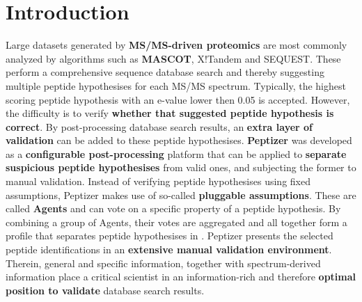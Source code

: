 \chapter{Introduction}
\npar Large datasets generated by \textbf{MS/MS-driven proteomics} are most commonly analyzed by algorithms such as \textbf{MASCOT}, X!Tandem and SEQUEST. These perform a comprehensive sequence database search and thereby suggesting multiple peptide hypothesises for each MS/MS spectrum. Typically, the highest scoring peptide hypothesis with an e-value lower then 0.05 is accepted. However, the difficulty is to verify \textbf{whether that suggested peptide hypothesis is correct}. By post-processing database search results, an \textbf{extra layer of validation} can be added to these peptide hypothesises. \textbf{Peptizer} was developed as a \textbf{configurable post-processing }platform that can be applied to \textbf{separate suspicious peptide hypothesises} from valid ones, and subjecting the former to manual validation.
\npar Instead of verifying peptide hypothesises using fixed assumptions, Peptizer makes use of so-called \textbf{pluggable assumptions}. These are called \textbf{Agents} and can vote on a specific property of a peptide hypothesis. By combining a group of Agents, their votes are aggregated and all together form a profile that separates peptide hypothesises in .
\npar Peptizer presents the selected peptide identifications in an \textbf{extensive manual validation environment}. Therein, general and specific information, together with spectrum-derived information place a critical scientist in an information-rich and therefore \textbf{optimal position to validate }database search results.

